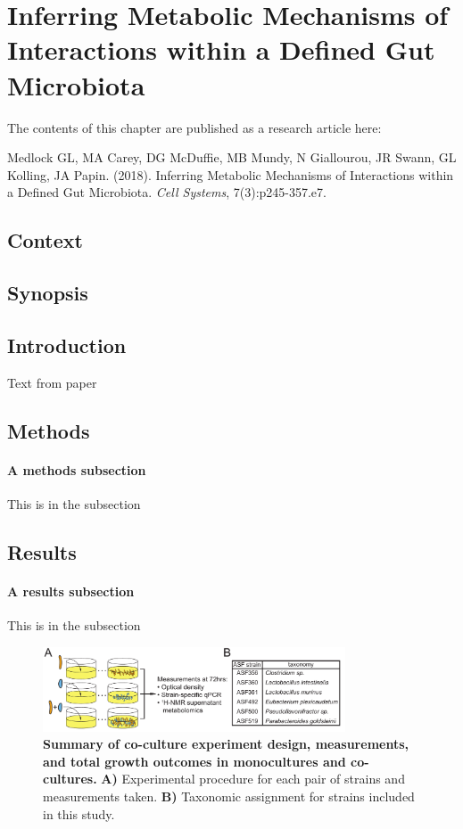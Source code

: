 \documentclass[11pt,twocolumn,notitlepage,openany,twoside]{book}
\begin{document}
\chapter{Inferring Metabolic Mechanisms of Interactions within a Defined Gut Microbiota}


The contents of this chapter are published as a research article here:

\medskip\noindent
Medlock GL, MA Carey, DG McDuffie, MB Mundy, N Giallourou, JR Swann, GL Kolling, JA Papin. (2018). Inferring Metabolic Mechanisms of Interactions within a Defined Gut Microbiota. \textit{Cell Systems}, 7(3):p245-357.e7.

\section{Context}

\section{Synopsis}

\section{Introduction}

Text from paper

\section{Methods}
\subsubsection{A methods subsection}
This is in the subsection

\section{Results}
\subsubsection{A results subsection}
This is in the subsection

\begin{figure}
\centering
\includegraphics[width=0.8\textwidth]{ch2_fig1}
\caption[Summary of co-culture experiment design, measurements, and total growth outcomes in monocultures and co-cultures.]{\textbf{Summary of co-culture experiment design, measurements, and total growth outcomes in monocultures and co-cultures.} \textbf{A)} Experimental procedure for each pair of strains and measurements taken. \textbf{B)} Taxonomic assignment for strains included in this study.}
\end{figure}
\end{document}

